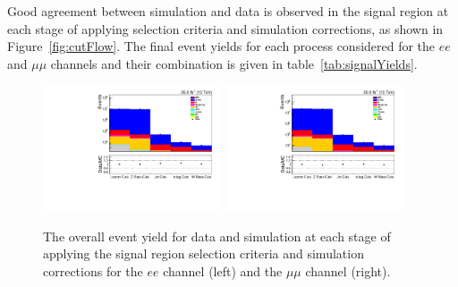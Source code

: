 Good agreement between simulation and data is observed in the signal region at each stage of applying selection criteria and simulation corrections, as shown in Figure~\ref{fig:cutFlow}.
The final event yields for each process considered for the $ee$ and $\mu\mu$ channels and their combination is given in table~\ref{tab:signalYields}.

\begin{figure}[tbp]
\centering
\includegraphics[width=0.47\textwidth]{figs/background-estimation/plots/unblinded/prompt_ee_ttbarInc/cutFlow_log.pdf}
\includegraphics[width=0.47\textwidth]{figs/background-estimation/plots/unblinded/prompt_mumu_ttbarInc/cutFlow_log.pdf}
\caption{
The overall event yield for data and simulation at each stage of applying the signal region selection criteria and simulation corrections for the $ee$ channel (left) and the $\mu\mu$ channel (right).
}
\label{fig:SR_cutFlow}
\end{figure}

